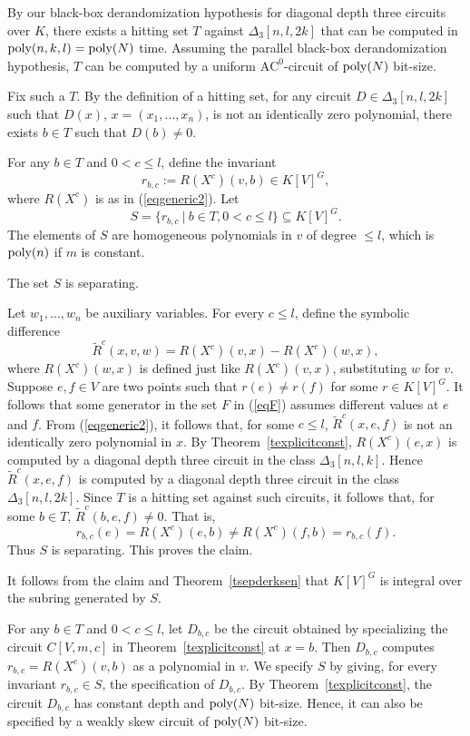 \documentclass[11pt]{article}
\begin{document}
By our black-box derandomization hypothesis  for  diagonal depth three circuits over $K$,
there exists a  hitting set  $T$ against $\Delta_3[n,l,2 k]$ that can be computed  in ${\mbox {poly}}(n,k,l)={\mbox {poly}}(N)$ time.
Assuming the  parallel black-box derandomization hypothesis, $T$ can  be computed by a uniform $\mbox{AC}^0$-circuit of 
${\mbox {poly}}(N)$ bit-size.

Fix such a $T$. By the definition of a hitting set, for any circuit $D \in \Delta_3[n,l,2 k]$ such that $D(x)$, $x=(x_1,\ldots,x_n)$,
is not an identically zero polynomial,
there exists $b \in T$ such that $D(b) \not = 0$.

For any $b \in T$ and $0<c\le l$, define the invariant 
\[ r_{b,c}:=R(X^c)(v,b) \in K[V]^G,\] 
where $R(X^c)$ is as in (\ref{eqgeneric2}).
Let 
\begin{equation} \label{eqShilbert}
 S= \{ r_{b,c}  \ | \  b \in T, 0 < c \le l\}  \subseteq K[V]^G.
\end{equation}
The elements of $S$ are homogeneous polynomials in $v$ of  degree $\le l$, which is ${\mbox {poly}}(n)$ if $m$ is constant.

\begin{claim} The set  $S$ is separating. 
\end{claim}
\proof Let $w_1,\ldots,w_n$ be auxiliary variables. For every $c \le l$, define the symbolic difference
\[ \tilde R^c(x,v,w)= R(X^c)(v,x) - R(X^c)(w,x), \] 
where $R(X^c)(w,x)$ is defined just like $R(X^c)(v,x)$, substituting $w$ for $v$.
Suppose $e,f  \in V$ are two points such that $r(e) \not = r(f)$ for some 
$r \in K[V]^G$. It follows that some generator in the set $F$ in (\ref{eqF}) assumes different values at $e$ and $f$.
From (\ref{eqgeneric2}), it follows that, for some $c \le l$, $\tilde R^c(x,e,f)$ is not an identically zero polynomial in
$x$. By Theorem~\ref{texplicitconst}, $R(X^c)(e,x)$ is computed by a diagonal depth three circuit in the class 
$\Delta_3[n,l,k]$. Hence $\tilde R^c(x,e,f)$ is computed by a diagonal depth three circuit in the class 
$\Delta_3[n,l,2 k]$. Since $T$ is a hitting set against such circuits,
it follows that, for some $b \in T$, $\tilde R^c(b,e,f) \not = 0$. That is,
\[ r_{b,c}(e)=R(X^c)(e,b) \not = R(X^c)(f,b)=r_{b,c}(f). \]  Thus $S$ is separating. This proves the claim.

It follows from the claim and Theorem~\ref{tsepderksen} that $K[V]^G$ is integral over the subring generated by $S$.

For any $b\in T$ and $0<c\le l$, let $D_{b,c}$ be the circuit obtained by specializing the circuit 
$C[V,m,c]$ in Theorem~\ref{texplicitconst} at $x=b$. Then $D_{b,c}$ computes $r_{b,c}=R(X^c)(v,b)$ as a polynomial in $v$.
We  specify $S$ by giving, for every invariant $r_{b,c} \in S$,
the specification of  $D_{b,c}$. By Theorem~\ref{texplicitconst}, the circuit $D_{b,c}$  has constant depth and ${\mbox {poly}}(N)$ bit-size.
Hence, it can also be  specified by  a weakly skew circuit  of ${\mbox {poly}}(N)$ bit-size.
\end{document}
